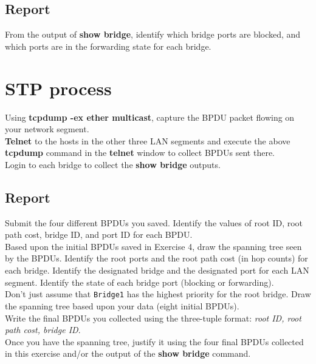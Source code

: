 \documentclass[10pt,a4paper]{article}
\numberwithin{equation}{section}
\numberwithin{figure}{section}
\numberwithin{table}{section}
\begin{document}
    \subsection*{Report}
    From the output of \textbf{show bridge}, identify which bridge ports are blocked, and which ports are in the forwarding state for each bridge.

\section{STP process}
    Using \textbf{tcpdump -ex ether multicast}, capture the BPDU packet flowing on your network segment. \\
    \textbf{Telnet} to the hosts in the other three LAN segments and execute the above \textbf{tcpdump} command in the \textbf{telnet} window to collect BPDUs sent there. \\
    Login to each bridge to collect the \textbf{show bridge} outputs.
    \subsection*{Report}
    Submit the four different BPDUs you saved.
    Identify the values of root ID, root path cost, bridge ID, and port ID for each BPDU. \\
    Based upon the initial BPDUs saved in Exercise 4, draw the spanning tree seen by the BPDUs. Identify the root ports and the root path cost (in hop counts) for each bridge.
    Identify the designated bridge and the designated port for each LAN segment.
    Identify the state of each bridge port (blocking or forwarding). \\
    Don’t just assume that \texttt{Bridge1} has the highest priority for the root bridge.
    Draw the spanning tree based upon your data (eight initial BPDUs). \\
    Write the final BPDUs you collected using the three-tuple format: \textit{{root ID, root path cost, bridge ID}}. \\
    Once you have the spanning tree, justify it using the four final BPDUs collected in this exercise and/or the output of the \textbf{show bridge} command.
\end{document}

